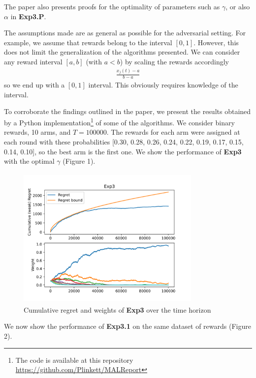 \documentclass[12pt,a4paper]{article}
\begin{document}
The paper also presents proofs for the optimality of parameters such as $\gamma$, or also $\alpha$ in \textbf{Exp3.P}. 

The assumptions made are as general as possible for the adversarial setting. For example, we assume that rewards belong to the interval $[0,1]$. However, this does not limit the generalization of the algorithms presented. We can consider any reward interval $[a,b]$ (with $a < b$) by scaling the rewards accordingly
\begin{align*}
	\frac{x_j(t) - a }{b - a}
\end{align*}  
so we end up with a $[0,1]$ interval. This obviously requires knowledge of the interval.

To corroborate the findings outlined in the paper, we present the results obtained by a Python implementation\footnote{The code is available at this repository \url{https://github.com/Plinkett/MALReport}} of some of the algorithms.
We consider binary rewards, 10 arms, and $T = 100000$. The rewards for each arm were assigned at each round with these probabilities [0.30, 0.28, 0.26, 0.24, 0.22, 0.19, 0.17, 0.15, 0.14, 0.10], so the best arm is the first one. We show the performance of \textbf{Exp3} with the optimal $\gamma$ (Figure 1).

\begin{figure}[!htb]
	\begin{center}
		\includegraphics[width=90mm, height=70mm]{exp3optimal.png}
		\caption{Cumulative regret and weights of \textbf{Exp3} over the time horizon}
	\end{center}
\end{figure}

We now show the performance of \textbf{Exp3.1} on the same dataset of rewards (Figure 2). 
\end{document}
